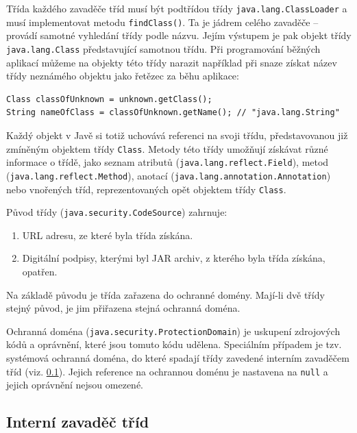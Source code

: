 Třída každého zavaděče tříd musí být podtřídou třídy {\tt java.lang.ClassLoader} a musí implementovat metodu {\tt findClass()}. Ta je jádrem celého zavaděče -- provádí samotné vyhledání třídy podle názvu. Jejím výstupem je pak objekt třídy {\tt java.lang.Class} představující samotnou třídu. Při programování běžných aplikací můžeme na objekty této třídy narazit například při snaze získat název třídy neznámého objektu jako řetězec za běhu aplikace: \cite{refClassLoader}

\begin{lstlisting}[caption=Získávání názvu třídy neznámého objektu, label=getClassName]
Class classOfUnknown = unknown.getClass();
String nameOfClass = classOfUnknown.getName(); // "java.lang.String"
\end{lstlisting}

Každý objekt v Javě si totiž uchovává referenci na svoji třídu, představovanou již zmíněným objektem třídy {\tt Class}. Metody této třídy umožňují získávat různé informace o třídě, jako seznam atributů ({\tt java.lang.reflect.Field}), metod ({\tt java.lang.reflect.Method}), anotací ({\tt java.lang.annotation.Annotation}) nebo vnořených tříd, reprezentovaných opět objektem třídy {\tt Class}.

Původ třídy ({\tt java.security.CodeSource}) zahrnuje:

\begin{enumerate}
  \item URL adresu, ze které byla třída získána.
  \item Digitální podpisy, kterými byl JAR archiv, z kterého byla třída získána, opatřen.
\end{enumerate}

Na základě původu je třída zařazena do ochranné domény. Mají-li dvě třídy stejný původ, je jim přiřazena stejná ochranná doména. \cite[5.1]{oaks}\cite{sourceSecureClassLoader}

Ochranná doména ({\tt java.security.ProtectionDomain}) je uskupení zdrojových kódů a oprávnění, které jsou tomuto kódu udělena.
Speciálním případem je tzv. systémová ochranná doména, do které spadají třídy zavedené interním zavaděčem tříd (viz. \ref{interniZavadec}). Jejich reference na ochrannou doménu je nastavena na {\tt null} a jejich oprávnění nejsou omezené. \cite[5.4]{oaks}

\subsection{Interní zavaděč tříd} \label{interniZavadec}

